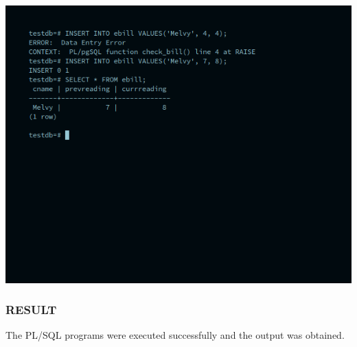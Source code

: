 \documentclass[10pt,a4paper,titlepage]{report}
\begin{document}
{\begin{enumerate}
	\includegraphics[width=\linewidth]{../Images/Triggers/7.png}
\end{enumerate}

\subsubsection{RESULT}
The PL/SQL programs were executed successfully and the output was obtained.

}
\end{document}
